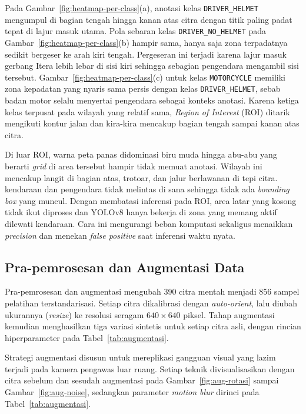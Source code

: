 Pada Gambar~\ref{fig:heatmap-per-class}(a), anotasi kelas \texttt{DRIVER\_HELMET} mengumpul di bagian tengah hingga kanan atas citra dengan titik paling padat tepat di lajur masuk utama. Pola sebaran kelas \texttt{DRIVER\_NO\_HELMET} pada Gambar~\ref{fig:heatmap-per-class}(b) hampir sama, hanya saja zona terpadatnya sedikit bergeser ke arah kiri tengah. Pergeseran ini terjadi karena lajur masuk gerbang Itera lebih lebar di sisi kiri sehingga sebagian pengendara mengambil sisi tersebut. Gambar~\ref{fig:heatmap-per-class}(c) untuk kelas \texttt{MOTORCYCLE} memiliki zona kepadatan yang nyaris sama persis dengan kelas \texttt{DRIVER\_HELMET}, sebab badan motor selalu menyertai pengendara sebagai konteks anotasi. Karena ketiga kelas terpusat pada wilayah yang relatif sama, \textit{Region of Interest} (ROI) ditarik mengikuti kontur jalan dan kira-kira mencakup bagian tengah sampai kanan atas citra.

Di luar ROI, warna peta panas didominasi biru muda hingga abu-abu yang berarti \textit{grid} di area tersebut hampir tidak memuat anotasi. Wilayah ini mencakup langit di bagian atas, trotoar, dan jalur berlawanan di tepi citra. kendaraan dan pengendara tidak melintas di sana sehingga tidak ada \textit{bounding box} yang muncul. Dengan membatasi inferensi pada ROI, area latar yang kosong tidak ikut diproses dan YOLOv8 hanya bekerja di zona yang memang aktif dilewati kendaraan. Cara ini mengurangi beban komputasi sekaligus menaikkan \textit{precision} dan menekan \textit{false positive} saat inferensi waktu nyata.

%
%
\subsection{Pra-pemrosesan dan Augmentasi Data}
\label{subsec:preprocessing-augmentasi}
%

Pra-pemrosesan dan augmentasi mengubah 390 citra mentah menjadi 856 sampel pelatihan terstandarisasi. Setiap citra dikalibrasi dengan \textit{auto-orient}, lalu diubah ukurannya (\textit{resize}) ke resolusi seragam $640 \times 640$ piksel. Tahap augmentasi kemudian menghasilkan tiga variasi sintetis untuk setiap citra asli, dengan rincian hiperparameter pada Tabel~\ref{tab:augmentasi}.


Strategi augmentasi disusun untuk mereplikasi gangguan visual yang lazim terjadi pada kamera pengawas luar ruang. Setiap teknik divisualisasikan dengan citra sebelum dan sesudah augmentasi pada Gambar~\ref{fig:aug-rotasi} sampai Gambar~\ref{fig:aug-noise}, sedangkan parameter \textit{motion blur} dirinci pada Tabel~\ref{tab:augmentasi}.

